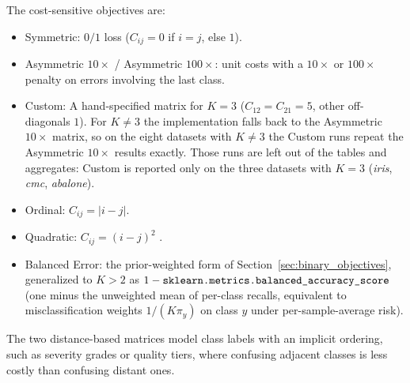 The cost-sensitive objectives are:
\begin{itemize}
    \item Symmetric: $0/1$ loss ($C_{ij} = 0$ if $i = j$, else $1$).
    \item Asymmetric $10\times$ / Asymmetric $100\times$: unit costs with a $10\times$ or $100\times$ penalty on errors involving the last class.
    \item Custom: A hand-specified matrix for $K\!=\!3$ ($C_{12} = C_{21} = 5$, other off-diagonals $1$). For $K \neq 3$ the implementation falls back to the Asymmetric $10\times$ matrix, so on the eight datasets with $K \neq 3$ the Custom runs repeat the Asymmetric $10\times$ results exactly. Those runs are left out of the tables and aggregates: Custom is reported only on the three datasets with $K = 3$ (\textit{iris}, \textit{cmc}, \textit{abalone}).
    \item Ordinal: $C_{ij} = |i - j|$.
    \item Quadratic: $C_{ij} = (i - j)^2$ \citep{obrien2008costsensitive}.
    \item Balanced Error: the prior-weighted form of Section~\ref{sec:binary_objectives}, generalized to $K > 2$ as $1 - \texttt{sklearn.\allowbreak metrics.\allowbreak balanced\_\allowbreak accuracy\_\allowbreak score}$ (one minus the unweighted mean of per-class recalls, equivalent to misclassification weights $1/(K\pi_y)$ on class $y$ under per-sample-average risk).
\end{itemize}
The two distance-based matrices model class labels with an implicit ordering, such as severity grades or quality tiers, where confusing adjacent classes is less costly than confusing distant ones.

